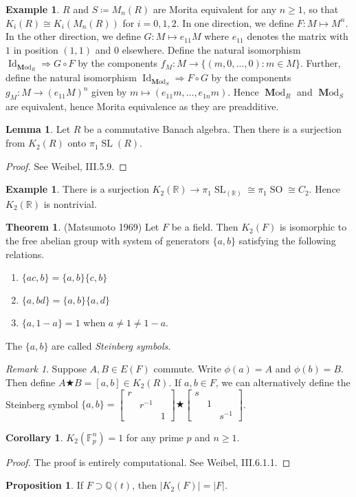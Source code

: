 \documentclass[10pt,letterpaper,cm]{nupset}
\theoremstyle{definition}
\newtheorem{exmp}[definition]{Example}
\theoremstyle{theorem}
\newtheorem{theorem}[definition]{Theorem}
\newtheorem{lemma}[definition]{Lemma}
\newtheorem{prop}[definition]{Proposition}
\newtheorem{corollary}[definition]{Corollary}
\theoremstyle{remark}
\newtheorem{remark}[definition]{Remark}
\newcommand{\F}{\mathbb F}
\newcommand{\Q}{\mathbb Q}
\newcommand{\R}{\mathbb R}
\newcommand{\1}{\mathbf{1}}
\newcommand{\0}{\vec 0}
\DeclareMathOperator*{\SL}{SL}
\DeclareMathOperator*{\SO}{SO}
\DeclareMathOperator{\id}{Id}
\DeclareMathOperator{\Mod}{\mathbf Mod}
\begin{document}
\begin{exmp}
$R$ and $S\coloneqq M_n(R)$ are Morita equivalent for any $n\geq 1$, so that $K_i(R) \cong K_i(M_n(R))$ for $i=0, 1, 2$. In one direction, we define $F: M \mapsto M^n$. In the other direction, we define $G: M \mapsto e_{11}M$ where $e_11$ denotes the matrix with $1$ in position $(1, 1)$ and $0$ elsewhere. Define the natural isomorphism $\id_{\Mod_R} \Rightarrow G\circ F$ by the components $f_M : M \to \{(m, 0, \ldots, 0) : m \in M\}$. Further, define the natural isomorphism $\id_{\Mod_S} \Rightarrow F\circ G$ by the components  $g_M : M \to (e_{11}M)^n$ given by $m\mapsto (e_{11}m, \ldots, e_{1n}m)$. Hence $\Mod_R$ and $\Mod_S$ are equivalent, hence Morita equivalence as they are preadditive.
\end{exmp}

\begin{lemma}
Let $R$ be a commutative Banach algebra. Then there is a surjection from $K_2(R)$ onto $\pi_1\SL(R)$. 
\end{lemma}
\begin{proof}
See Weibel, III.5.9.
\end{proof}

\begin{exmp}
There is a surjection $K_2(\R) \to \pi_1 \SL_(\R) \cong \pi_1\SO \cong C_2$. Hence $K_2(\R)$ is nontrivial.
\end{exmp}

\begin{theorem}{(Matsumoto 1969)}
Let $F$ be a field. Then $K_2(F)$ is isomorphic to the free abelian group with system of generators $\{a, b\}$  satisfying the following relations.
\begin{enumerate}
\item $\{ac, b\} = \{a, b\}\{c, b\}$
\item $\{a, bd\} = \{a, b\}\{a, d\}$
\item $\{a, 1-a\}=1$ when $a \ne 1 \ne 1-a$.
\end{enumerate}
The $\{a,b\}$ are called \textit{Steinberg symbols}.
\end{theorem}
\begin{remark}
Suppose $A, B \in E(F)$ commute. Write $\phi(a) =A$ and $\phi(b) = B$. Then define $A \bigstar B =[a,b] \in K_2(R)$. If $a,b\in F$, we can alternatively define the Steinberg symbol $\{a, b\} = \begin{bmatrix}
    r & & \\
    & r^{-1} & \\
    & & 1
  \end{bmatrix}
 \bigstar
  \begin{bmatrix}
    s & & \\
    & 1 & \\
    & & s^{-1}
  \end{bmatrix}
 $. 
\end{remark}

\begin{corollary}
$K_2(\F_p^n) =1$ for any prime $p$ and $n\geq 1$.
\end{corollary}
\begin{proof}
The proof is entirely computational. See Weibel, III.6.1.1.
\end{proof}

\begin{prop}
If $F \supset \Q(t)$, then $|K_2(F)| = |F|$.
\end{prop}
\end{document}
